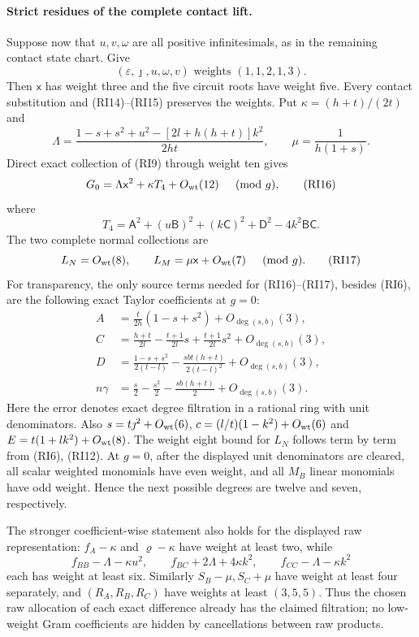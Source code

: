 \paragraph{Strict residues of the complete contact lift.}
Suppose now that $u,v,\omega$ are all positive infinitesimals, as
in the remaining contact state chart. Give
\[
 (\varepsilon,\jmath,u,\omega,v)
       \text{ weights }(1,1,2,1,3).
\]
Then $\mathsf x$ has weight three and the five circuit roots have
weight five. Every contact substitution and (RI14)--(RI15) preserves
the weights. Put $\kappa=(h+t)/(2t)$ and
\[
 \Lambda=\frac{1-s+s^2+u^2-[2l+h(h+t)]k^2}{2ht},\qquad
 \mu=\frac1{h(1+s)}.
\]
Direct exact collection of (RI9) through weight ten gives
\[
 G_0=\Lambda\mathsf x^2+\kappa T_4+O_{\rm wt}(12)
                   \quad\pmod g,                 \tag{RI16}
\]
where
\[
 T_4=\mathsf A^2+(u\mathsf B)^2+(k\mathsf C)^2+
          \mathsf D^2-4k^2\mathsf B\mathsf C.
\]
The two complete normal collections are
\[
 L_N=O_{\rm wt}(8),\qquad
 L_M=\mu\mathsf x+O_{\rm wt}(7)\quad\pmod g.
 \tag{RI17}
\]
For transparency, the only source terms needed for (RI16)--(RI17),
besides (RI6), are the following exact Taylor coefficients at $g=0$:
\[
\begin{aligned}
 A&=\frac t{2h}(1-s+s^2)+O_{\deg(s,b)}(3),\\
 C&=\frac{h+t}{2l}-\frac{t+1}{2l}s+
                      \frac{t+1}{2l}s^2+O_{\deg(s,b)}(3),\\
 D&=\frac{1-s+s^2}{2(t-l)}-
        \frac{sbt(h+t)}{2(t-l)^2}+O_{\deg(s,b)}(3),\\
 n\gamma&=\frac s2-\frac{s^2}2-\frac{sb(h+t)}2+
                         O_{\deg(s,b)}(3).
\end{aligned}                                                       \tag{RI18}
\]
Here the error denotes exact degree filtration in a rational ring
with unit denominators. Also $s=t\jmath^2+O_{\rm wt}(6)$,
$c=(l/t)(1-k^2)+O_{\rm wt}(6)$ and
$E=t(1+lk^2)+O_{\rm wt}(8)$. The weight eight bound for $L_N$
follows term by term from (RI6), (RI12).
At $g=0$, after the displayed unit denominators are cleared, all
scalar weighted monomials have even weight, and all $M_B$ linear
monomials have odd weight. Hence the next possible degrees are
twelve and seven, respectively.

The stronger coefficient-wise statement also holds for the displayed
raw representation: $f_A-\kappa$ and $\varrho-\kappa$ have weight at
least two, while
\[
 f_{BB}-\Lambda-\kappa u^2,\qquad
 f_{BC}+2\Lambda+4\kappa k^2,\qquad
 f_{CC}-\Lambda-\kappa k^2
\]
each has weight at least six. Similarly $S_B-\mu,S_C+\mu$ have
weight at least four separately, and $(R_A,R_B,R_C)$ have weights
at least $(3,5,5)$. Thus the chosen raw allocation of each exact
difference already has the claimed filtration; no low-weight
Gram coefficients are hidden by cancellations between raw products.

